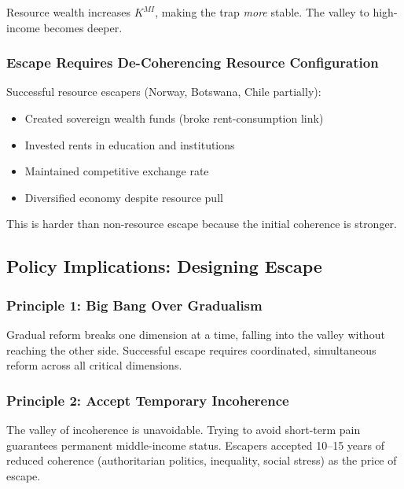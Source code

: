 Resource wealth increases $K^{MI}$, making the trap \emph{more} stable. 
The valley to high-income becomes deeper.

\subsubsection{Escape Requires De-Coherencing Resource Configuration}

Successful resource escapers (Norway, Botswana, Chile partially):
\begin{itemize}
    \item Created sovereign wealth funds (broke rent-consumption link)
    \item Invested rents in education and institutions
    \item Maintained competitive exchange rate
    \item Diversified economy despite resource pull
\end{itemize}

This is harder than non-resource escape because the initial coherence is stronger.

\subsection{Policy Implications: Designing Escape}

\subsubsection{Principle 1: Big Bang Over Gradualism}

\begin{tcolorbox}[colback=yellow!5!white, colframe=yellow!75!black]
Gradual reform breaks one dimension at a time, falling into the valley 
without reaching the other side. Successful escape requires coordinated, 
simultaneous reform across all critical dimensions.
\end{tcolorbox}

\subsubsection{Principle 2: Accept Temporary Incoherence}

\begin{tcolorbox}[colback=yellow!5!white, colframe=yellow!75!black]
The valley of incoherence is unavoidable. Trying to avoid short-term pain 
guarantees permanent middle-income status. Escapers accepted 10--15 years 
of reduced coherence (authoritarian politics, inequality, social stress) 
as the price of escape.
\end{tcolorbox}

